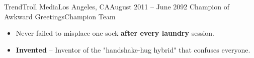       \vspace{-1.5em}

     \resumeSubheadingWork
      {TrendTroll Media}{\hspace{-6em}Los Angeles, CA}{August 2011 -- June 2092}
      {Champion of Awkward Greetings}{Champion Team}
      \begin{itemize}[label=\textbf{$\bullet$}]
        \setlength{\itemsep}{-0.15em} %
        \item{Never failed to misplace one sock \textbf{after every laundry} session.}
        \item{\textbf{Invented} – Inventor of the "handshake-hug hybrid" that confuses everyone.}
      \end{itemize}

  \resumeSubHeadingListEnd
